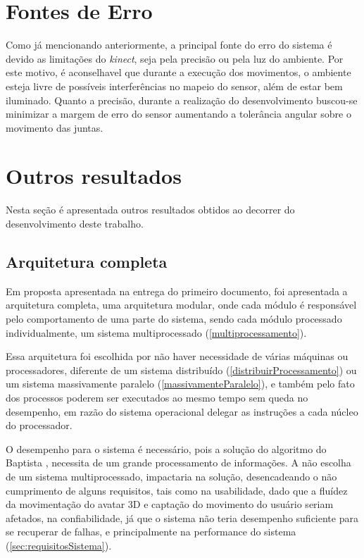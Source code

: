 \section{Fontes de Erro}\label{sol:fontesErro}
  Como já mencionando anteriormente, a principal fonte do erro do sistema é devido as limitações do \textit{kinect}, seja pela precisão ou pela luz do ambiente.
Por este motivo, é aconselhavel que durante a execução dos movimentos, o ambiente esteja livre de possíveis interferências no mapeio do  sensor, além de estar bem iluminado. Quanto a precisão,
durante a realização do desenvolvimento buscou-se minimizar a margem de erro do sensor aumentando a tolerância angular sobre o movimento das juntas.

\section{Outros resultados}\label{sol:outrosResultados}
  Nesta seção é apresentada outros resultados obtidos ao decorrer do desenvolvimento deste trabalho.

\subsection{Arquitetura completa}\label{sol:arquiCompleta}
Em proposta apresentada na entrega do primeiro documento, foi apresentada a arquitetura completa, uma arquitetura modular, onde cada módulo é responsável
pelo comportamento de uma parte do sistema, sendo cada módulo processado individualmente, um sistema multiprocessado (\ref{multiprocessamento}).

Essa arquitetura foi
escolhida por não haver necessidade de várias máquinas ou processadores, diferente de um sistema distribuído (\ref{distribuirProcessamento}) ou um sistema massivamente paralelo (\ref{massivamenteParalelo}),
e também pelo fato dos processos poderem ser executados ao mesmo tempo sem queda no desempenho, em razão do sistema operacional delegar as instruções a cada núcleo do processador.

O desempenho para o sistema é
necessário, pois a solução do algoritmo do Baptista \cite{roberto}, necessita de um grande processamento de informações. A não escolha de um sistema multiprocessado,
impactaria na solução, desencadeando o não cumprimento de alguns requisitos, tais como na usabilidade, dado que a fluídez da movimentação do avatar 3D e captação do movimento do usuário
seriam afetados, na confiabilidade, já que o sistema não teria desempenho suficiente para se recuperar de falhas, e principalmente na performance do sistema (\ref{sec:requisitosSistema}).

